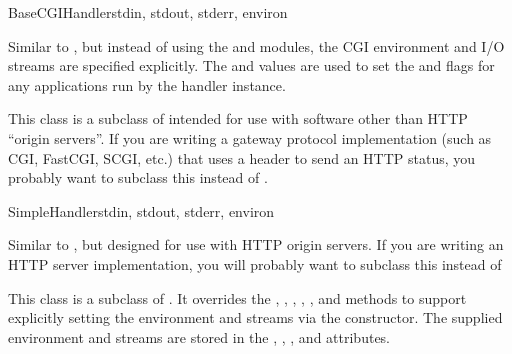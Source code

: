 \begin{classdesc}{BaseCGIHandler}{stdin, stdout, stderr, environ
}

Similar to , but instead of using the  and
 modules, the CGI environment and I/O streams are specified
explicitly.  The  and  values are
used to set the  and 
flags for any applications run by the handler instance.

This class is a subclass of  intended for use with
software other than HTTP ``origin servers''.  If you are writing a
gateway protocol implementation (such as CGI, FastCGI, SCGI, etc.) that
uses a  header to send an HTTP status, you probably want
to subclass this instead of .
\end{classdesc}



\begin{classdesc}{SimpleHandler}{stdin, stdout, stderr, environ
}

Similar to , but designed for use with HTTP origin
servers.  If you are writing an HTTP server implementation, you will
probably want to subclass this instead of 

This class is a subclass of .  It overrides the
, , ,
, , and 
methods to support explicitly setting the environment and streams via
the constructor.  The supplied environment and streams are stored in
the , , , and
 attributes.
\end{classdesc}

